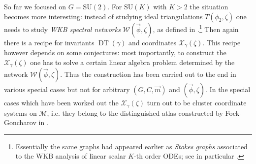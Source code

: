 \documentclass[12pt,letterpaper,reqno]{article}
\numberwithin{equation}{section}
\newcommand{\cB}{\ensuremath{\mathcal B}}
\newcommand{\cM}{\ensuremath{\mathcal M}}
\newcommand{\cX}{\ensuremath{\mathcal X}}
\newcommand{\cW}{\ensuremath{\mathcal W}}
\newcommand{\bbC}{\ensuremath{\mathbb C}}
\newcommand{\half}{\ensuremath{\frac{1}{2}}}
\newcommand{\de}{\mathrm{d}}
\newcommand{\abs}[1]{\lvert#1\rvert}
\newcommand{\vphi}{{\vec\phi}}
\newcommand{\ti}[1]{\textit{#1}}
\DeclareMathOperator{\DT}{DT}
\newcommand{\SU}{\mathrm{SU}}
\begin{document}


\begin{remark} \label{rem:higher-rank}
So far we focused on $G = \SU(2)$.
For $\SU(K)$ with $K>2$ the situation becomes more interesting:
instead of studying ideal triangulations $T(\phi_2, \zeta)$ 
one needs to study \ti{WKB spectral networks} $\cW(\vphi, \zeta)$, as defined in \cite{Gaiotto2012}.\footnote{Essentially the same graphs had appeared earlier as 
\ti{Stokes graphs} associated to the WKB analysis of
linear scalar $K$-th order ODEs; see in particular \cite{berk:988}.}
Then again there is a recipe for invariants $\DT(\gamma)$
and coordinates $\cX_\gamma(\zeta)$. This recipe however 
depends on some conjectures:
most importantly, to construct the $\cX_\gamma(\zeta)$ 
one has to solve a certain linear algebra problem determined by the 
network $\cW(\vphi,\zeta)$.
Thus the construction has been carried out to the end in various special
cases but not for arbitrary $(G,C,\vec{m})$ and $(\vphi, \zeta)$. In the special cases which have been worked out
\cite{Gaiotto:2012db,Neitzke:2017yos} the $\cX_\gamma(\zeta)$
turn out to be cluster coordinate systems on $\cM$,
i.e. they belong to the distinguished atlas constructed
by Fock-Goncharov in \cite{MR2233852}.
\end{remark}
\end{document}
